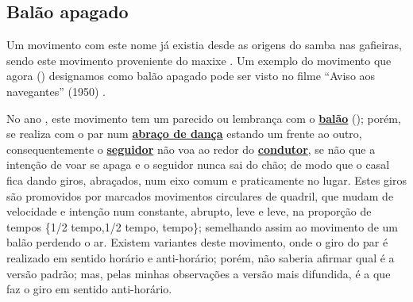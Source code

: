 \subsection{Balão apagado}
Um movimento com este nome já existia desde as origens do samba nas gafieiras, 
sendo este movimento proveniente do maxixe \cite[pp. 142]{perna2002samba} \cite[pp. 68]{efege1974maxixe}.
Um exemplo do movimento que agora (\AnoLivro) designamos como balão apagado pode 
ser visto no filme ``Aviso aos navegantes'' (1950) \cite[min. 40:35]{AtlantidaDance}.

No ano \AnoLivro, este movimento tem um parecido ou lembrança com o \hyperref[def:PassoBalao]{\textbf{balão}} (\AnoLivro); 
porém, se realiza com o par num \hyperref[def:abracodedanca]{\textbf{abraço de dança}} estando um frente ao outro, 
consequentemente o \hyperref[def:Seguidor]{\textbf{seguidor}} não voa ao redor do \hyperref[def:Condutor]{\textbf{condutor}}, 
se não que a intenção de voar se apaga e o seguidor nunca sai do chão; 
de modo que o casal fica dando giros, abraçados, num eixo comum e praticamente no lugar. 
Estes giros são promovidos por marcados movimentos circulares de quadril, que mudam
de velocidade e intenção num constante, abrupto, leve e leve,  na proporção de tempos \{1/2 tempo,1/2 tempo, tempo\}; 
semelhando assim ao movimento de um balão perdendo o ar.
Existem variantes deste movimento, onde o giro do par é realizado em sentido horário e anti-horário; porém, 
não saberia afirmar qual é a versão padrão; mas, pelas minhas observações a versão mais difundida,
é a que faz o giro em sentido anti-horário.


